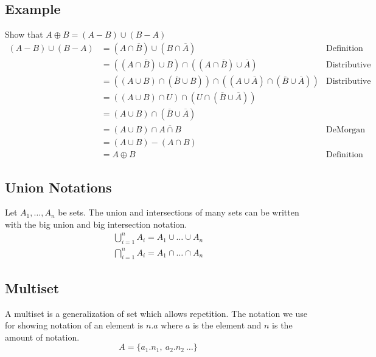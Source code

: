 \documentclass{article}
\theoremstyle{mytheoremstyle}
\theoremstyle{mytheoremstyle}
\theoremstyle{myproblemstyle}
\begin{document}
    \subsection*{Example}
    Show that $A\oplus B=(A-B)\cup(B-A)$
    \begin{align*}
        (A-B)\cup (B-A)
        &= (A\cap\overline{B})\cup(B\cap\overline{A}) & \text{Definition} \\
        &= ((A\cap\overline{B})\cup B)\cap((A\cap\overline{B})\cup \overline{A}) & \text{Distributive}\\
        &= ((A\cup B) \cap (\overline{B}\cup B)) \cap ((A\cup \overline{A}) \cap(\overline{B}\cup\overline{A})) & \text{Distributive} \\
        &= ((A\cup B) \cap U) \cap (U \cap(\overline{B}\cup\overline{A})) \\
        &= (A\cup B) \cap (\overline{B}\cup \overline{A}) \\
        &= (A\cup B) \cap \overline{A\cap B} & \text{DeMorgan}\\
        &= (A\cup B) - (A\cap B) \\
        &= A\oplus B & \text{Definition}
    \end{align*}

    \subsection*{Union Notations}
    Let $A_1,\dots,A_n$ be sets. The union and intersections of many sets can be
    written with the big union and big intersection notation.
    \begin{align*}
        \bigcup_{i=1}^n A_i = A_1 \cup \dots \cup A_n \\
        \bigcap_{i=1}^n A_i = A_1 \cap \dots \cap A_n
    \end{align*}

    \subsection*{Multiset}
    A multiset is a generalization of set which allows repetition. The notation
    we use for showing notation of an element is $n.a$ where $a$ is the element
    and $n$ is the amount of notation.
    \[
        A = \{a_1.n_1,\ a_2.n_2\ \dots\}
    \]
\end{document}
